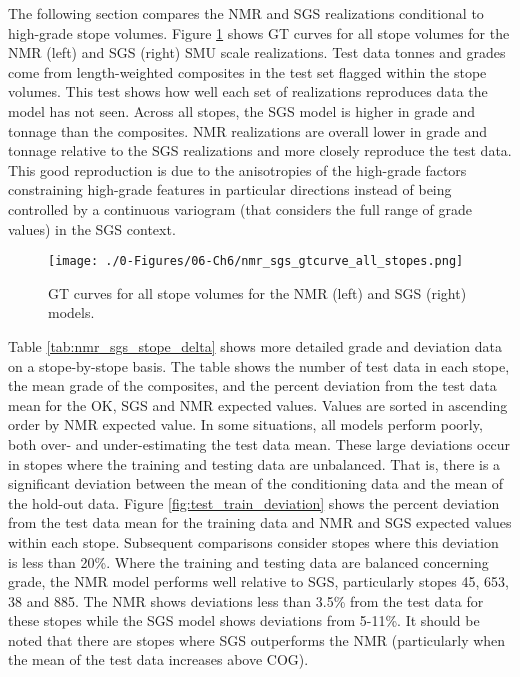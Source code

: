 The following section compares the \gls{NMR} and \gls{SGS} realizations conditional to high-grade stope volumes. Figure \ref{fig:nmr_sgs_gtcurve_all_stopes} shows \gls{GT} curves for all stope volumes for the \gls{NMR} (left) and \gls{SGS} (right) \gls{SMU} scale realizations. Test data tonnes and grades come from length-weighted composites in the test set flagged within the stope volumes. This test shows how well each set of realizations reproduces data the model has not seen. Across all stopes, the \gls{SGS} model is higher in grade and tonnage than the composites. \gls{NMR} realizations are overall lower in grade and tonnage relative to the \gls{SGS} realizations and more closely reproduce the test data. This good reproduction is due to the anisotropies of the high-grade factors constraining high-grade features in particular directions instead of being controlled by a continuous variogram (that considers the full range of grade values) in the \gls{SGS} context.

\begin{figure}[htb!]
    \centering
    \texttt{[image: ./0-Figures/06-Ch6/nmr\_sgs\_gtcurve\_all\_stopes.png]}
    \caption{\Gls{GT} curves for all stope volumes for the \gls{NMR} (left) and \gls{SGS} (right) models. }
    \label{fig:nmr_sgs_gtcurve_all_stopes}
\end{figure}

Table \ref{tab:nmr_sgs_stope_delta} shows more detailed grade and deviation data on a stope-by-stope basis. The table shows the number of test data in each stope, the mean grade of the composites, and the percent deviation from the test data mean for the \gls{OK}, \gls{SGS} and \gls{NMR} expected values. Values are sorted in
ascending order by \gls{NMR} expected value. In some situations, all models perform poorly, both over- and under-estimating the test data mean. These large deviations occur in stopes where the training and testing data are unbalanced. That is, there is a significant deviation between the mean of the conditioning data and the mean of the hold-out data. Figure \ref{fig:test_train_deviation} shows the percent deviation from the test data mean for the training data and \gls{NMR} and \gls{SGS} expected values within each stope. Subsequent comparisons consider stopes where this deviation is less than 20\%. Where the training and testing data are balanced concerning grade, the \gls{NMR} model performs well relative to \gls{SGS}, particularly stopes 45, 653, 38 and 885. The \gls{NMR} shows deviations less than 3.5\% from the test data for these stopes while the \gls{SGS} model shows deviations from 5-11\%. It should be noted that there are stopes where \gls{SGS} outperforms the \gls{NMR} (particularly when the mean of the test data increases above \gls{COG}).

